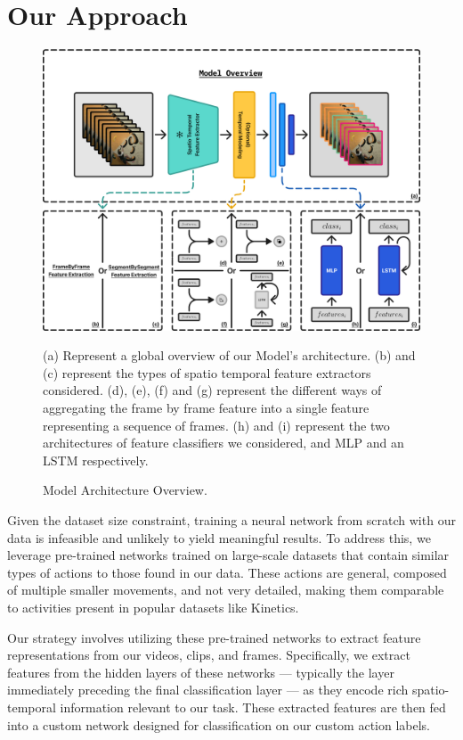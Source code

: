 \section{Our Approach}

\begin{figure}[t]
    \centering
    \includegraphics[width=\textwidth]{../../assets/figures/model-overview.png}
    \caption{Model Architecture Overview.}
    \label{figure:model-architecture-overview}
    \medskip
    \small\par
    (a) Represent a global overview of our Model's architecture. (b) and (c) represent the types of spatio temporal feature extractors considered. (d), (e), (f) and (g) represent the different ways of aggregating the frame by frame feature into a single feature representing a sequence of frames. (h) and (i) represent the two architectures of feature classifiers we considered, and MLP and an LSTM respectively.
\end{figure}

Given the dataset size constraint, training a neural network from scratch with our data is infeasible and unlikely to yield meaningful results. To address this, we leverage pre-trained networks trained on large-scale datasets that contain similar types of actions to those found in our data. These actions are general, composed of multiple smaller movements, and not very detailed, making them comparable to activities present in popular datasets like Kinetics.

Our strategy involves utilizing these pre-trained networks to extract feature representations from our videos, clips, and frames. Specifically, we extract features from the hidden layers of these networks — typically the layer immediately preceding the final classification layer — as they encode rich spatio-temporal information relevant to our task. These extracted features are then fed into a custom network designed for classification on our custom action labels.


